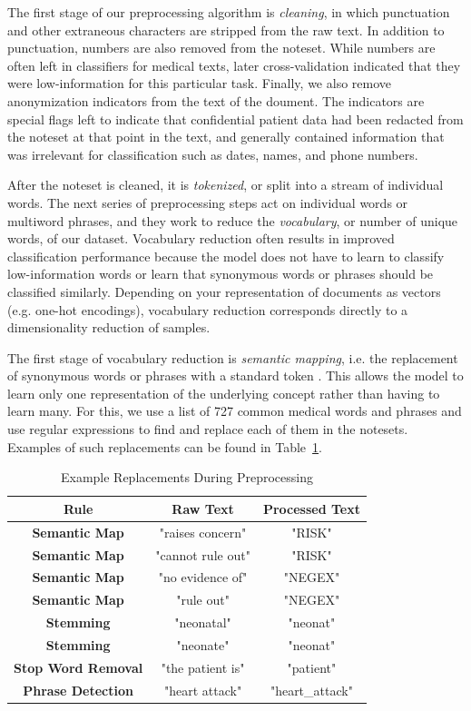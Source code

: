 \documentclass[conference]{IEEEtran}
\begin{document}
The first stage of our preprocessing algorithm is \textit{cleaning}, in which punctuation and other extraneous characters are stripped from the raw text. In addition to punctuation, numbers are also removed from the noteset. While numbers are often left in classifiers for medical texts, later cross-validation indicated that they were low-information for this particular task. Finally, we also remove anonymization indicators from the text of the doument. The indicators are special flags left to indicate that confidential patient data had been redacted from the noteset at that point in the text, and generally contained information that was irrelevant for classification such as dates, names, and phone numbers.

After the noteset is cleaned, it is \textit{tokenized}, or split into a stream of individual words. The next series of preprocessing steps act on individual words or multiword phrases, and they work to reduce the \textit{vocabulary}, or number of unique words, of our dataset. Vocabulary reduction often results in improved classification performance \cite{Madsen} because the model does not have to learn to classify low-information words or learn that synonymous words or phrases should be classified similarly. Depending on your representation of documents as vectors (e.g. one-hot encodings), vocabulary reduction corresponds directly to a dimensionality reduction of samples.

The first stage of vocabulary reduction is \textit{semantic mapping}, i.e. the replacement of synonymous words or phrases with a standard token \cite{Banerjee}. This allows the model to learn only one representation of the underlying concept rather than having to learn many. For this, we use a list of 727 common medical words and phrases \cite{Tamang} and use regular expressions to find and replace each of them in the notesets. Examples of such replacements can be found in Table~\ref{reptab}.
\begin{table}[htbp]
\caption{Example Replacements During Preprocessing}
\begin{center}
\begin{tabular}{ccc}
\textbf{Rule}&\textbf{Raw Text}&\textbf{Processed Text} \\
\hline
\textbf{Semantic Map} & "raises concern" & "RISK" \\
\textbf{Semantic Map} & "cannot rule out" & "RISK" \\
\textbf{Semantic Map} & "no evidence of" & "NEGEX" \\
\textbf{Semantic Map} & "rule out" & "NEGEX" \\
\textbf{Stemming} & "neonatal" & "neonat" \\
\textbf{Stemming} & "neonate" & "neonat" \\
\textbf{Stop Word Removal} & "the patient is" & "patient" \\
\textbf{Phrase Detection} & "heart attack" & "heart\_attack" \\
\end{tabular}
\label{reptab}
\end{center}
\end{table}
\end{document}
